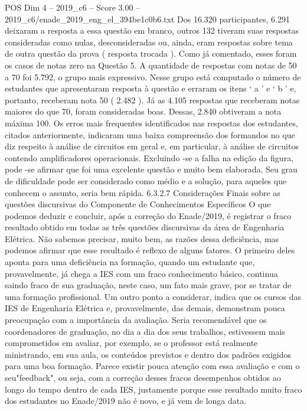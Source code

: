 \begin{textsample}{POS Dim 4 – 2019\_c6 – Score 3.00 – 2019\_c6/enade\_2019\_eng\_el\_394be1c0b6.txt}
Dos 16.320 participantes, 6.291 deixaram a resposta a essa questão em branco, outros 132 tiveram suas respostas consideradas como nulas, desconsideradas ou, ainda, eram respostas sobre tema de outra questão da prova ( resposta trocada ).
Como já comentado, esses foram os casos de notas zero na Questão 5.
A quantidade de respostas com notas de 50 a 70 foi 5.792, o grupo mais expressivo.
Nesse grupo está computado o número de estudantes que apresentaram resposta à questão e erraram os itens ‘ a ’ e ‘ b ’ e, portanto, receberam nota 50 ( 2.482 ).
Já as 4.105 respostas que receberam notas maiores do que 70, foram consideradas boas.
Dessas, 2.840 obtiveram a nota máxima 100.
Os erros mais frequentes identificados nas respostas dos estudantes, citados anteriormente, indicaram uma baixa compreensão dos formandos no que diz respeito à análise de circuitos em geral e, em particular, à análise de circuitos contendo amplificadores operacionais.
Excluindo -se a falha na edição da figura, pode -se afirmar que foi uma excelente questão e muito bem elaborada.
Seu grau de dificuldade pode ser considerado como médio e a solução, para aqueles que conhecem o assunto, seria bem rápida. 6.3.2.7 Considerações Finais sobre as questões discursivas do Componente de Conhecimentos Específicos O que podemos deduzir e concluir, após a correção do Enade/2019, é registrar o fraco resultado obtido em todas as três questões discursivas da área de Engenharia Elétrica.
Não sabemos precisar, muito bem, as razões dessa deficiência, mas podemos afirmar que esse resultado é reflexo de alguns fatores.
O primeiro deles aponta para uma deficiência na formação, quando um estudante que, provavelmente, já chega a IES com um fraco conhecimento básico, continua saindo fraco de sua graduação, neste caso, um fato mais grave, por se tratar de uma formação profissional.
Um outro ponto a considerar, indica que os cursos das IES de Engenharia Elétrica e, provavelmente, das demais, demonstram pouca preocupação com a importância da avaliação.
Seria recomendável que os coordenadores de graduação, no dia a dia dos seus trabalhos, estivessem mais comprometidos em avaliar, por exemplo, se o professor está realmente ministrando, em sua aula, os conteúdos previstos e dentro dos padrões exigidos para uma boa formação.
Parece existir pouca atenção com essa avaliação e com o seu"feedback", ou seja, com a correção desses fracos desempenhos obtidos ao longo do tempo dentro de cada IES, justamente porque esse resultado muito fraco dos estudantes no Enade/2019 não é novo, e já vem de longa data.

\end{textsample}
